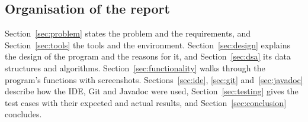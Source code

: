\subsection{Organisation of the report}

Section~\ref{sec:problem} states the problem and the requirements, and Section~\ref{sec:tools} the tools and the
environment. Section~\ref{sec:design} explains the design of the program and the reasons for it, and
Section~\ref{sec:dsa} its data structures and algorithms. Section~\ref{sec:functionality} walks through the program's
functions with screenshots. Sections~\ref{sec:ide}, \ref{sec:git} and~\ref{sec:javadoc} describe how the IDE, Git and
Javadoc were used, Section~\ref{sec:testing} gives the test cases with their expected and actual results, and
Section~\ref{sec:conclusion} concludes.
